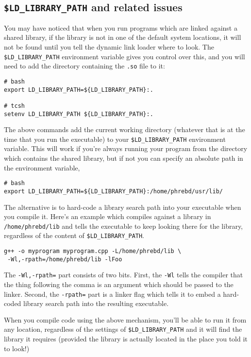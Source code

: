 \documentclass[a4paper]{scrartcl}
\begin{document}
\subsection{\texttt{\$LD\_LIBRARY\_PATH} and related issues}
You may have noticed that when you run programs which are linked against a shared library, if the library is not in one of the default system locations, it will not be found until you tell the dynamic link loader where to look. The \verb|$LD_LIBRARY_PATH| environment variable gives you control over this, and you will need to add the directory containing the \verb|.so| file to it:
\begin{verbatim}
# bash
export LD_LIBRARY_PATH=${LD_LIBRARY_PATH}:.

# tcsh
setenv LD_LIBRARY_PATH ${LD_LIBRARY_PATH}:.
\end{verbatim}

The above commands add the current working directory (whatever that is at the time that you run the executable) to your \verb|$LD_LIBRARY_PATH| environment variable. This will work if you're always running your program from the directory which contains the shared library, but if not you can specify an absolute path in the environment variable,
\begin{verbatim}
# bash
export LD_LIBRARY_PATH=${LD_LIBRARY_PATH}:/home/phrebd/usr/lib/
\end{verbatim}

The alternative is to hard-code a library search path into your executable when you compile it. Here's an example which compiles against a library in \verb|/home/phrebd/lib| and tells the executable to keep looking there for the library, regardless of the content of \verb|$LD_LIBRARY_PATH|.
\begin{verbatim}
g++ -o myprogram myprogram.cpp -L/home/phrebd/lib \
 -Wl,-rpath=/home/phrebd/lib -lFoo
\end{verbatim}

The \verb|-Wl,-rpath=| part consists of two bits. First, the \verb|-Wl| tells the compiler that the thing following the comma is an argument which should be passed to the linker. Second, the \verb|-rpath=| part is a linker flag which tells it to embed a hard-coded library search path into the resulting executable.

When you compile code using the above mechanism, you'll be able to run it from any location, regardless of the settings of \verb|$LD_LIBRARY_PATH| and it will find the library it requires (provided the library is actually located in the place you told it to look!)
\end{document}
